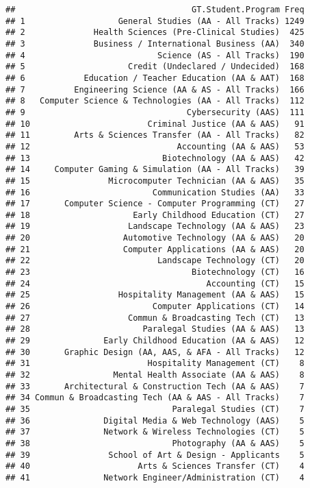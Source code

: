 \documentclass[]{article}
\begin{document}
\begin{verbatim}
##                                    GT.Student.Program Freq
## 1                   General Studies (AA - All Tracks) 1249
## 2              Health Sciences (Pre-Clinical Studies)  425
## 3              Business / International Business (AA)  340
## 4                           Science (AS - All Tracks)  190
## 5                     Credit (Undeclared / Undecided)  168
## 6            Education / Teacher Education (AA & AAT)  168
## 7          Engineering Science (AA & AS - All Tracks)  166
## 8   Computer Science & Technologies (AA - All Tracks)  112
## 9                                 Cybersecurity (AAS)  111
## 10                        Criminal Justice (AA & AAS)   91
## 11         Arts & Sciences Transfer (AA - All Tracks)   82
## 12                              Accounting (AA & AAS)   53
## 13                           Biotechnology (AA & AAS)   42
## 14     Computer Gaming & Simulation (AA - All Tracks)   39
## 15                Microcomputer Technician (AA & AAS)   35
## 16                         Communication Studies (AA)   33
## 17       Computer Science - Computer Programming (CT)   27
## 18                     Early Childhood Education (CT)   27
## 19                    Landscape Technology (AA & AAS)   23
## 20                   Automotive Technology (AA & AAS)   20
## 21                   Computer Applications (AA & AAS)   20
## 22                          Landscape Technology (CT)   20
## 23                                 Biotechnology (CT)   16
## 24                                    Accounting (CT)   15
## 25                  Hospitality Management (AA & AAS)   15
## 26                         Computer Applications (CT)   14
## 27                    Commun & Broadcasting Tech (CT)   13
## 28                       Paralegal Studies (AA & AAS)   13
## 29               Early Childhood Education (AA & AAS)   12
## 30       Graphic Design (AA, AAS, & AFA - All Tracks)   12
## 31                        Hospitality Management (CT)    8
## 32                 Mental Health Associate (AA & AAS)    8
## 33       Architectural & Construction Tech (AA & AAS)    7
## 34 Commun & Broadcasting Tech (AA & AAS - All Tracks)    7
## 35                             Paralegal Studies (CT)    7
## 36               Digital Media & Web Technology (AAS)    5
## 37               Network & Wireless Technologies (CT)    5
## 38                             Photography (AA & AAS)    5
## 39                School of Art & Design - Applicants    5
## 40                      Arts & Sciences Transfer (CT)    4
## 41               Network Engineer/Administration (CT)    4

\end{verbatim}
\end{document}
